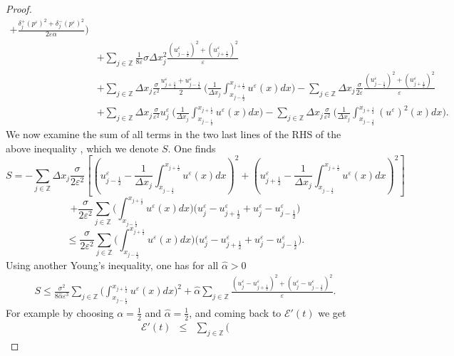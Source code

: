 \documentclass[a4paper,french,english,10pt]{article}
\newcommand\eps{\varepsilon}
\begin{document}
\begin{proof}
\begin{equation*}
\begin{aligned}
+\frac{\delta_{j}^+(p^{\eps})^2+\delta_{j}^-(p^{\eps}
)^2}{2\eps\alpha} \bigg) \\
&+ \sum_{j\in \mathbb{Z}} \frac{1}{8\eps} \sigma \Delta x_j^2
\frac{(u_{j-\frac12 }^{\eps})^2+ (u_{j+\frac12 }^{\eps})^2}{\eps}\\
&+ \sum_{j\in \mathbb{Z}} \Delta x_j  \frac{\sigma}{\eps^2}
\frac{u_{j+\frac12 }^{\eps}+u_{j-\frac12 }^{\eps}}{2}\: \bigg(
\frac{1}{\Delta x_j} {\int_{x_{j-\frac12}}^{x_{j+\frac12}}}
 u^{\eps}(x) dx \bigg) 
-\sum_{j\in \mathbb{Z}} \Delta x_j \frac{\sigma}{2\eps}
\frac{(u_{j-\frac12 }^{\eps})^2+(u_{j+\frac12 }^{\eps})^2}{\eps} \\
&+ \sum_{j\in \mathbb{Z}} \Delta x_j  \frac{\sigma}{\eps^2} u^{\eps}_j \:
\bigg( \frac{1}{\Delta x_j} {\int_{x_{j-\frac12}}^{x_{j+\frac12}}} u^{\eps}(x) dx \bigg) -
\sum_{j\in \mathbb{Z}} \Delta x_j \frac{ \sigma  }{\eps^2} \: \bigg(
\frac{1}{\Delta x_j} {\int_{x_{j-\frac12}}^{x_{j+\frac12}}} (u^{\eps})^2(x) dx \bigg).
\end{aligned}
\end{equation*} 
We now examine
 the sum of all terms in the two last lines of the RHS of the above inequality , which we denote $S$. 
One finds
$$
S
=-
\sum_{j\in \mathbb{Z}} \Delta x_j \frac{\sigma}{2\eps^2}
\left[
{
\left(u_{j-\frac12 }^{\eps}-\frac{1}{\Delta x_j}
{\int_{x_{j-\frac12}}^{x_{j+\frac12}}} u^{\eps}(x) dx\right)^2+
\left(u_{j+\frac12 }^{\eps}
-\frac{1}{\Delta x_j} {\int_{x_{j-\frac12}}^{x_{j+\frac12}}} u^{\eps}(x) dx
\right)^2}\right]
$$
$$
+\frac{\sigma}{2\eps^2} \sum_{j\in \mathbb{Z}}\bigg( 
{\int_{x_{j-\frac12}}^{x_{j+\frac12}}} u^{\eps}(x) dx \bigg)\bigg( u_j^{\eps}-u_{j+\frac12 }^{\eps} +
u_j^{\eps}-u_{j-\frac12 }^{\eps}\bigg)
$$
$$ \leq \frac{\sigma}{2\eps^2} \sum_{j\in \mathbb{Z}}\bigg( 
{\int_{x_{j-\frac12}}^{x_{j+\frac12}}} u^{\eps}(x) dx \bigg)\bigg( u_j^{\eps}-u_{j+\frac12 }^{\eps} +
u_j^{\eps}-u_{j-\frac12 }^{\eps}\bigg).
$$
Using another Young's inequality, one has for all $\widehat{\alpha}>0$
\begin{eqnarray*}
S \leq \frac{\sigma^2}{8\widehat{\alpha}\eps^3} \sum_{j\in \mathbb{Z}}\bigg(
{\int_{x_{j-\frac12}}^{x_{j+\frac12}}} u^{\eps}(x) dx \bigg)^2+ \widehat{\alpha} \sum_{j\in
\mathbb{Z}} \frac{(u^{\eps}_j-u_{j+\frac12 }^{\eps})^2 +
(u^{\eps}_j-u_{j-\frac12 }^{\eps})^2}{\eps} .
\end{eqnarray*}
For example by choosing $\alpha=\frac12$ and $\widehat{\alpha}=\frac12$, and coming back to $\mathscr{E}'(t) $ we get
\begin{eqnarray} 
\mathscr{E}'(t)  & \leq & \sum_{j\in \mathbb{Z}} \bigg(

\end{eqnarray}
\end{proof}
\end{document}

